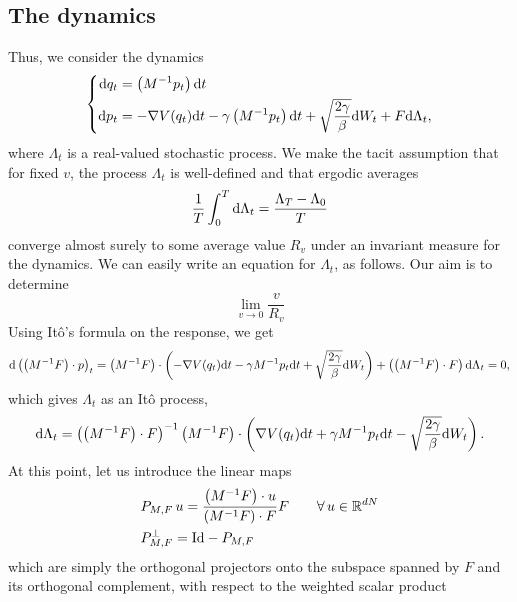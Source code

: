 \subsection{The dynamics}
Thus, we consider the dynamics
\begin{equation}
    \label{eq:norton_method}
    \left\{\begin{aligned}
        \mathrm{d} q_t&=\left(M^{-1}p_t\right)\mathrm{d} t\\
        \mathrm{d} p_t&=-\nabla V(q_t)\mathrm{d} t -\gamma\left(M^{-1}p_t\right)\mathrm{d} t+\sqrt{\frac{2\gamma}\beta}\mathrm{d} W_t+F\mathrm{d} \Lambda_t,
    \end{aligned}\right.
\end{equation}
where $\Lambda_t$ is a real-valued stochastic process. We make the tacit assumption that for fixed $v$, the process $\Lambda_t$ is well-defined and that ergodic averages
\[\frac1 T\int_0^T \mathrm{d}\Lambda_t=\frac{\Lambda_T-\Lambda_0}T\]
converge almost surely to some average value $R_v$ under an invariant measure for the dynamics. We can easily write an equation for $\Lambda_t$, as follows.
Our aim is to determine
\[\underset{v\to 0}\lim \frac{v}{R_v}\]
Using Itô's formula on the response, we get
\begin{equation}
    \label{eq:formula_response}
\mathrm{d} \left(\left(M^{-1}F\right)\cdot p\right)_t=\left(M^{-1}F\right)\cdot\left(-\nabla V(q_t)\mathrm{d} t -\gamma M^{-1}p_t\mathrm{d} t+\sqrt{\frac{2\gamma}\beta}\mathrm{d} W_t\right)+\left( \left(M^{-1}F\right)\cdot F\right)\mathrm{d}\Lambda_t=0,
\end{equation}
which gives $\Lambda_t$ as an Itô process,
\begin{equation}
    \label{eq:norton_multiplier_ito_decomposition}
    \mathrm{d} \Lambda_t=\left( \left(M^{-1}F\right)\cdot F\right)^{-1}\left(M^{-1}F\right)\cdot\left(\nabla V(q_t)\mathrm{d} t +\gamma M^{-1}p_t\mathrm{d} t-\sqrt{\frac{2\gamma}\beta}\mathrm{d} W_t\right).
\end{equation}
At this point, let us introduce the linear maps
\begin{equation}
    \label{eq:norton_projector}
    \begin{aligned}
        &P_{M,F}\,u=\frac{\left(M^{-1}F\right)\cdot u}{\left(M^{-1}F\right)\cdot F}F\qquad\forall\,u\in\mathbb{R}^{dN}\\
        &P_{M,F}^\perp=\mathrm{Id}-P_{M,F}
    \end{aligned}
\end{equation}
which are simply the orthogonal projectors onto the subspace spanned by $F$ and its orthogonal complement, with respect to the weighted scalar product
